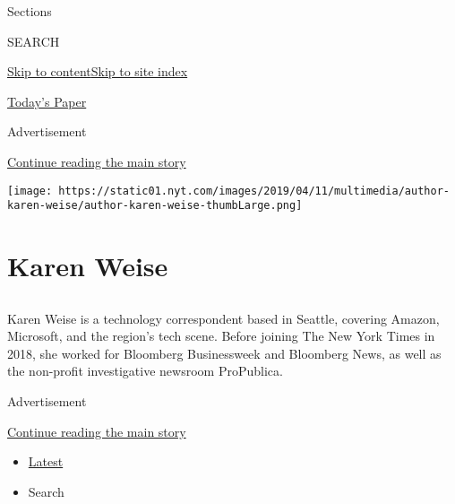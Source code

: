 Sections

SEARCH

\protect\hyperlink{site-content}{Skip to
content}\protect\hyperlink{site-index}{Skip to site index}

\href{https://myaccount.nytimes.com/auth/login?response_type=cookie\&client_id=vi}{}

\href{https://www.nytimes.com/section/todayspaper}{Today's Paper}

Advertisement

\protect\hyperlink{after-top}{Continue reading the main story}

\texttt{[image: https://static01.nyt.com/images/2019/04/11/multimedia/author-karen-weise/author-karen-weise-thumbLarge.png]}

\hypertarget{karen-weise}{%
\section{Karen Weise}\label{karen-weise}}

\subsection{}

Karen Weise is a technology correspondent based in Seattle, covering
Amazon, Microsoft, and the region's tech scene. Before joining The New
York Times in 2018, she worked for Bloomberg Businessweek and Bloomberg
News, as well as the non-profit investigative newsroom ProPublica.

Advertisement

\protect\hyperlink{after-mid1}{Continue reading the main story}

\begin{itemize}
\tightlist
\item
  \protect\hyperlink{stream-panel}{Latest}
\item
  Search
\end{itemize}


